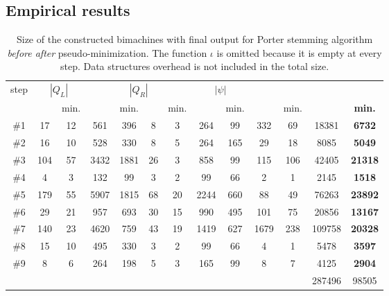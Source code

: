 \documentclass{article}
\newcommand{\len}[1]{\ensuremath{\left| #1 \right|}}
\begin{document}
	\subsection{Empirical results} \label{subsection:implementation:results}
	\begin{table}
		\centering
		\begin{adjustbox}{center=\textwidth}
			\begin{tabular}{c *{5}{|c>{}c} |c>{\textbf\bgroup}c<{\egroup}}
				step & \multicolumn{2}{c|}{$\len{Q_L}$} & \multicolumn{2}{c|}{$\len{\delta_L}$} & \multicolumn{2}{c|}{$\len{Q_R}$} & \multicolumn{2}{c|}{$\len{\delta_R}$} & \multicolumn{2}{c|}{$\len{\psi}$} &  \\ %
					&& min. && min. && min. && min. && min. && min. \\ \hline\hline
				\#1 & 17  & 12 & 561  & 396  & 8  & 3  & 264  & 99  & 332  & 69  & \num{18381}  & \num{6732}  \\ \hline
				\#2 & 16  & 10 & 528  & 330  & 8  & 5  & 264  & 165 & 29   & 18  & \num{8085}   & \num{5049}  \\ \hline
				\#3 & 104 & 57 & 3432 & 1881 & 26 & 3  & 858  & 99  & 115  & 106 & \num{42405}  & \num{21318} \\ \hline
				\#4 & 4   & 3  & 132  & 99   & 3  & 2  & 99   & 66  & 2    & 1   & \num{2145}   & \num{1518}  \\ \hline
				\#5 & 179 & 55 & 5907 & 1815 & 68 & 20 & 2244 & 660 & 88   & 49  & \num{76263}  & \num{23892} \\ \hline
				\#6 & 29  & 21 & 957  & 693  & 30 & 15 & 990  & 495 & 101  & 75  & \num{20856}  & \num{13167} \\ \hline
				\#7 & 140 & 23 & 4620 & 759  & 43 & 19 & 1419 & 627 & 1679 & 238 & \num{109758} & \num{20328} \\ \hline
				\#8 & 15  & 10 & 495  & 330  & 3  & 2  & 99   & 66  & 4    & 1   & \num{5478}   & \num{3597}  \\ \hline
				\#9 & 8   & 6  & 264  & 198  & 5  & 3  & 165  & 99  & 8    & 7   & \num{4125}   & \num{2904}  \\ \hline\hline
				 & \num{287496} & \num{98505} \\
			\end{tabular}
		\end{adjustbox}
		\caption{Size of the constructed bimachines with final output for Porter stemming algorithm \emph{before \colorbox{light-gray}{after}} pseudo-minimization. The function $\iota$ is omitted because it is empty at every step. Data structures overhead is not included in the total size.}
		\label{table:size:Porter:bmfo}
	\end{table}
\end{document}
